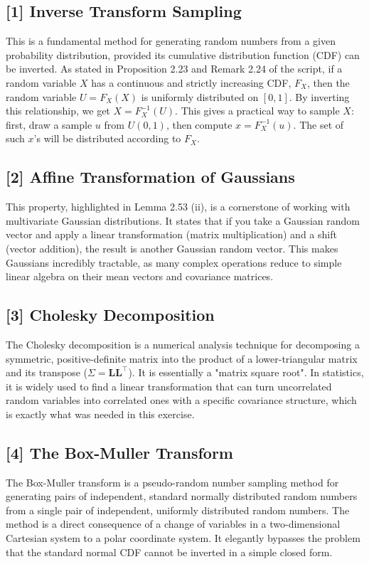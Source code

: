 \documentclass[11pt,a4paper]{article}
\newcommand{\mat}[1]{\mathbf{#1}}
\newcommand{\T}{\top}
\begin{document}
\subsection*{[1] Inverse Transform Sampling}
This is a fundamental method for generating random numbers from a given probability distribution, provided its cumulative distribution function (CDF) can be inverted. As stated in Proposition 2.23 and Remark 2.24 of the script, if a random variable $X$ has a continuous and strictly increasing CDF, $F_X$, then the random variable $U = F_X(X)$ is uniformly distributed on $[0,1]$. By inverting this relationship, we get $X = F_X^{-1}(U)$. This gives a practical way to sample $X$: first, draw a sample $u$ from $U(0,1)$, then compute $x = F_X^{-1}(u)$. The set of such $x$'s will be distributed according to $F_X$.

\hypertarget{concept:affine}{}%
\subsection*{[2] Affine Transformation of Gaussians}
This property, highlighted in Lemma 2.53 (ii), is a cornerstone of working with multivariate Gaussian distributions. It states that if you take a Gaussian random vector and apply a linear transformation (matrix multiplication) and a shift (vector addition), the result is another Gaussian random vector. This makes Gaussians incredibly tractable, as many complex operations reduce to simple linear algebra on their mean vectors and covariance matrices.

\hypertarget{concept:cholesky}{}%
\subsection*{[3] Cholesky Decomposition}
The Cholesky decomposition is a numerical analysis technique for decomposing a symmetric, positive-definite matrix into the product of a lower-triangular matrix and its transpose ($\Sigma = \mat{L}\mat{L}^\T$). It is essentially a "matrix square root". In statistics, it is widely used to find a linear transformation that can turn uncorrelated random variables into correlated ones with a specific covariance structure, which is exactly what was needed in this exercise.

\hypertarget{concept:boxmuller}{}%
\subsection*{[4] The Box-Muller Transform}
The Box-Muller transform is a pseudo-random number sampling method for generating pairs of independent, standard normally distributed random numbers from a single pair of independent, uniformly distributed random numbers. The method is a direct consequence of a change of variables in a two-dimensional Cartesian system to a polar coordinate system. It elegantly bypasses the problem that the standard normal CDF cannot be inverted in a simple closed form.
\end{document}
